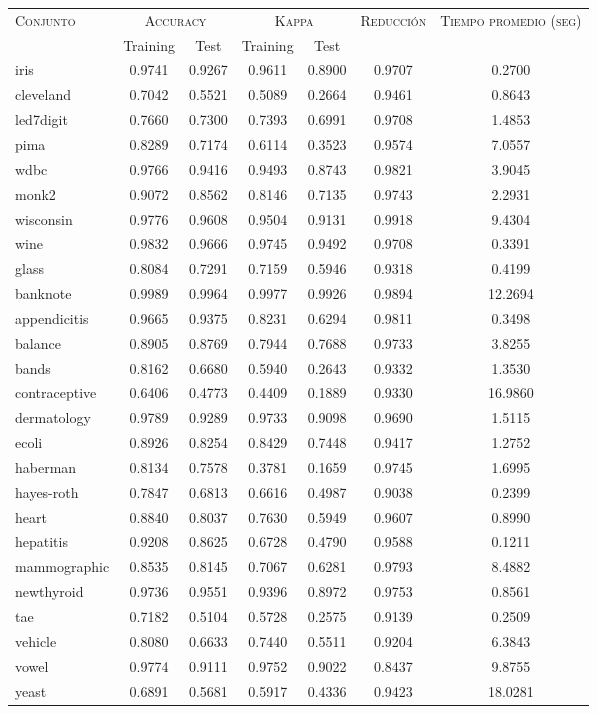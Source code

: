 \begin{table}[]
\centering
\begin{tabular}{l c c c c c c}
\hline
\multirow{2}{*}{\textsc{Conjunto}}
	& \multicolumn{2}{c}{\textsc{Accuracy}}
	& \multicolumn{2}{c}{\textsc{Kappa}}
	& \textsc{Reducción}
	& \textsc{Tiempo promedio (seg)} \\
	& Training & Test
	& Training & Test \\ 
\hline
\hline

iris & 0.9741 & 0.9267 & 0.9611 & 0.8900 & 0.9707 & 0.2700 \\
cleveland & 0.7042 & 0.5521 & 0.5089 & 0.2664 & 0.9461 & 0.8643 \\
led7digit & 0.7660 & 0.7300 & 0.7393 & 0.6991 & 0.9708 & 1.4853 \\
pima & 0.8289 & 0.7174 & 0.6114 & 0.3523 & 0.9574 & 7.0557 \\
wdbc & 0.9766 & 0.9416 & 0.9493 & 0.8743 & 0.9821 & 3.9045 \\
monk2 & 0.9072 & 0.8562 & 0.8146 & 0.7135 & 0.9743 & 2.2931 \\
wisconsin & 0.9776 & 0.9608 & 0.9504 & 0.9131 & 0.9918 & 9.4304 \\
wine & 0.9832 & 0.9666 & 0.9745 & 0.9492 & 0.9708 & 0.3391 \\
glass & 0.8084 & 0.7291 & 0.7159 & 0.5946 & 0.9318 & 0.4199 \\
banknote & 0.9989 & 0.9964 & 0.9977 & 0.9926 & 0.9894 & 12.2694 \\
appendicitis & 0.9665 & 0.9375 & 0.8231 & 0.6294 & 0.9811 & 0.3498 \\
balance & 0.8905 & 0.8769 & 0.7944 & 0.7688 & 0.9733 & 3.8255 \\
bands & 0.8162 & 0.6680 & 0.5940 & 0.2643 & 0.9332 & 1.3530 \\
contraceptive & 0.6406 & 0.4773 & 0.4409 & 0.1889 & 0.9330 & 16.9860 \\
dermatology & 0.9789 & 0.9289 & 0.9733 & 0.9098 & 0.9690 & 1.5115 \\
ecoli & 0.8926 & 0.8254 & 0.8429 & 0.7448 & 0.9417 & 1.2752 \\
haberman & 0.8134 & 0.7578 & 0.3781 & 0.1659 & 0.9745 & 1.6995 \\
hayes-roth & 0.7847 & 0.6813 & 0.6616 & 0.4987 & 0.9038 & 0.2399 \\
heart & 0.8840 & 0.8037 & 0.7630 & 0.5949 & 0.9607 & 0.8990 \\
hepatitis & 0.9208 & 0.8625 & 0.6728 & 0.4790 & 0.9588 & 0.1211 \\
mammographic & 0.8535 & 0.8145 & 0.7067 & 0.6281 & 0.9793 & 8.4882 \\
newthyroid & 0.9736 & 0.9551 & 0.9396 & 0.8972 & 0.9753 & 0.8561 \\
tae & 0.7182 & 0.5104 & 0.5728 & 0.2575 & 0.9139 & 0.2509 \\
vehicle & 0.8080 & 0.6633 & 0.7440 & 0.5511 & 0.9204 & 6.3843 \\
vowel & 0.9774 & 0.9111 & 0.9752 & 0.9022 & 0.8437 & 9.8755 \\
yeast & 0.6891 & 0.5681 & 0.5917 & 0.4336 & 0.9423 & 18.0281 \\


\end{tabular}
\end{table}

